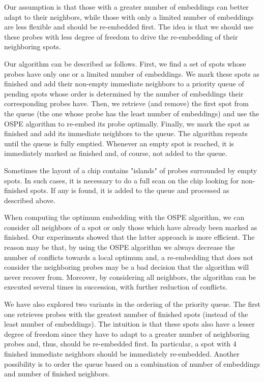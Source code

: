 \documentclass{article}
\begin{document}
Our assumption is that those with a greater number of embeddings can better adapt to their neighbors, while those with only a limited number of embeddings are less flexible and should be re-embedded first. The idea is that we should use these probes with less degree of freedom to drive the re-embedding of their neighboring spots. 

Our algorithm can be described as follows. First, we find a set of spots whose probes have only one or a limited number of embeddings. We mark these spots as finished and add their non-empty immediate neighbors to a priority queue of pending spots whose order is determined by the number of embeddings their corresponding probes have. Then, we retrieve (and remove) the first spot from the queue (the one whose probe has the least number of embeddings) and use the OSPE algorithm to re-embed its probe optimally. Finally, we mark the spot as finished and add its immediate neighbors to the queue. The algorithm repeats until the queue is fully emptied. Whenever an empty spot is reached, it is immediately marked as finished and, of course, not added to the queue. 

Sometimes the layout of a chip contains "islands" of probes surrounded by empty spots. In such cases, it is necessary to do a full scan on the chip looking for non-finished spots. If any is found, it is added to the queue and processed as described above. 

When computing the optimum embedding with the OSPE algorithm, we can consider all neighbors of a spot or only those which have already been marked as finished. Our experiments showed that the latter approach is more efficient. The reason may be that, by using the OSPE algorithm we always decrease the number of conflicts towards a local optimum and, a re-embedding that does not consider the neighboring probes may be a bad decision that the algorithm will never recover from. Moreover, by considering all neighbors, the algorithm can be executed several times in succession, with further reduction of conflicts. 

We have also explored two variants in the ordering of the priority queue. The first one retrieves probes with the greatest number of finished spots (instead of the least number of embeddings). The intuition is that these spots also have a lesser degree of freedom since they have to adapt to a greater number of neighboring probes and, thus, should be re-embedded first. In particular, a spot with 4 finished immediate neighbors should be immediately re-embedded. Another possibility is to order the queue based on a combination of number of embeddings and number of finished neighbors. 
\end{document}
